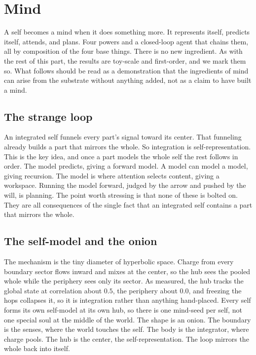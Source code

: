 \section{Mind}

A self becomes a mind when it does something more. It represents itself, predicts itself, attends, and plans. Four powers and a closed-loop agent that chains them, all by composition of the four base things. There is no new ingredient. As with the rest of this part, the results are toy-scale and first-order, and we mark them so. What follows should be read as a demonstration that the ingredients of mind can arise from the substrate without anything added, not as a claim to have built a mind.

\subsection{The strange loop}

An integrated self funnels every part's signal toward its center. That funneling already builds a part that mirrors the whole. So integration is self-representation. This is the key idea, and once a part models the whole self the rest follows in order. The model predicts, giving a forward model. A model can model a model, giving recursion. The model is where attention selects content, giving a workspace. Running the model forward, judged by the arrow and pushed by the will, is planning. The point worth stressing is that none of these is bolted on. They are all consequences of the single fact that an integrated self contains a part that mirrors the whole.

\subsection{The self-model and the onion}

The mechanism is the tiny diameter of hyperbolic space. Charge from every boundary sector flows inward and mixes at the center, so the hub sees the pooled whole while the periphery sees only its sector. As measured, the hub tracks the global state at correlation about $0.5$, the periphery about $0.0$, and freezing the hops collapses it, so it is integration rather than anything hand-placed. Every self forms its own self-model at its own hub, so there is one mind-seed per self, not one special soul at the middle of the world. The shape is an onion. The boundary is the senses, where the world touches the self. The body is the integrator, where charge pools. The hub is the center, the self-representation. The loop mirrors the whole back into itself.

